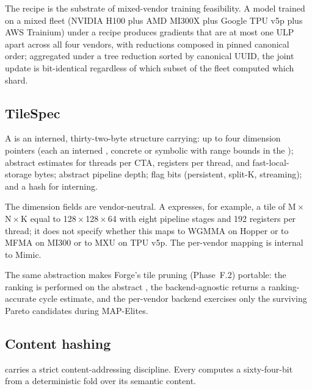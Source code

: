 The recipe is the substrate of mixed-vendor training feasibility.
A model trained on a mixed fleet (NVIDIA H100 plus AMD MI300X plus Google TPU v5p plus AWS Trainium) under a  recipe produces gradients that are at most one ULP apart across all four vendors, with reductions composed in pinned canonical order; aggregated under a tree reduction sorted by canonical UUID, the joint update is bit-identical regardless of which subset of the fleet computed which shard.

\subsection{TileSpec}
\label{sec:ir002-tile}

\begin{definition}[TileSpec]
\label{def:ir002-tile}
A  is an interned, thirty-two-byte structure carrying: up to four dimension pointers (each an interned , concrete  or symbolic  with range bounds in the ); abstract estimates for threads per CTA, registers per thread, and fast-local-storage bytes; abstract pipeline depth; flag bits (persistent, split-K, streaming); and a hash for interning.
\end{definition}

The dimension fields are vendor-neutral.
A  expresses, for example, a tile of M\,$\times$\,N\,$\times$\,K equal to 128\,$\times$\,128\,$\times$\,64 with eight pipeline stages and 192 registers per thread; it does not specify whether this maps to WGMMA  on Hopper or to MFMA  on MI300 or to MXU  on TPU v5p.
The per-vendor mapping is internal to Mimic.

The same abstraction makes Forge's tile pruning (Phase~F.2) portable: the ranking is performed on the abstract , the backend-agnostic  returns a ranking-accurate cycle estimate, and the per-vendor backend exercises only the surviving Pareto candidates during MAP-Elites.

\subsection{Content hashing}
\label{sec:ir002-content-hashing}

 carries a strict content-addressing discipline.
Every  computes a sixty-four-bit  from a deterministic fold over its semantic content.

